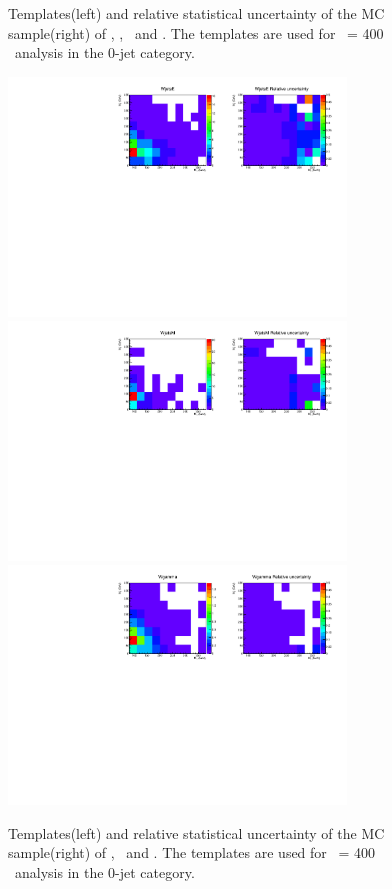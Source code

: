 \begin{figure}[htp]
\caption{Templates(left) and relative statistical uncertainty of the MC sample(right) 
of \qqww, \ggww, \topbkg\ and \vv. 
The templates are used for \mHi\ = 400 \GeV\ analysis in the 0-jet category.}
\label{fig:2dtemplate_400_0j_2}
\end{figure}

\begin{figure}[htp]
\centering
\includegraphics[width=0.8\textwidth]{figures/2dtemplate_WjetsE_mH400_0j.pdf}
\includegraphics[width=0.8\textwidth]{figures/2dtemplate_WjetsM_mH400_0j.pdf}
\includegraphics[width=0.8\textwidth]{figures/2dtemplate_Wgamma_mH400_0j.pdf}
\caption{Templates(left) and relative statistical uncertainty of the MC sample(right) 
of \WjetsE, \WjetsM\ and \wgamma. 
The templates are used for \mHi\ = 400 \GeV\ analysis in the 0-jet category.}
\label{fig:2dtemplate_400_0j_3}
\end{figure}

